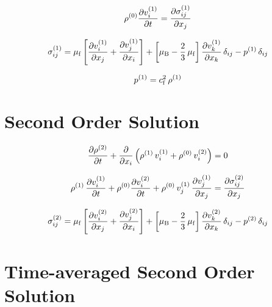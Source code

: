 \begin{equation}
  \rho^{(0)} \pdv{  v_{i}^{(1)}  }{t} = \pdv{  \sigma_{ij}^{(1)}  }{x_{j}}
  \label{eq:Th-st-navier}
\end{equation}

\begin{equation}
  \sigma_{ij}^{(1)} = \mu_{\mathrm{f}}\left[ \pdv{  v_{i}^{(1)}  }{x_{j}} + 
  \pdv{  v_{j}^{(1)}  }{x_{i}} \right] + \left[ \mu_{\mathrm{B}} - 
  \frac{2}{3}\,\mu_{\mathrm{f}} \right] \pdv{  v_{k}^{(1)}  }{x_{k}} \,\delta_{ij} - 
  p^{(1)}\,\delta_{ij}
  \label{eq:Th-st-stress}
\end{equation}

\begin{equation}
  p^{(1)} = c_{\mathrm{f}}^{2}\,\rho^{(1)}
  \label{eq:Th-st-pre}
\end{equation}



\section{Second Order Solution\label{sec:Th-secondorder}}

\begin{equation}
  \pdv{  \rho^{(2)}  }{t} + \pdv{x_{i}}\left(\rho^{(1)}\,v_{i}^{(1)} 
  + \rho^{(0)}\,v_{i}^{(2)} \right) = 0
  \label{eq:Th-nd-massconservatio}
\end{equation}

\begin{equation}
  \rho^{(1)}\,\pdv{  v_{i}^{(1)}  }{t} + \rho^{(0)} 
  \pdv{  v_{i}^{(2)}  }{t} + 
  \rho^{(0)}\,v_{j}^{(1)}\,\pdv{  v_{j}^{(1)}  }{x_{j}} = 
  \pdv{  \sigma_{ij}^{(2)}  }{x_{j}}
  \label{eq:Th-nd-navier}
\end{equation}

\begin{equation}
  \sigma_{ij}^{(2)} = \mu_{\mathrm{f}}\left[ \pdv{  v_{i}^{(2)}  }{x_{j}} + 
  \pdv{  v_{j}^{(2)}  }{x_{i}} \right] + \left[ \mu_{\mathrm{B}} - 
  \frac{2}{3}\,\mu_{\mathrm{f}} \right] \pdv{  v_{k}^{(2)}  }{x_{k}} \,\delta_{ij} - 
  p^{(2)}\,\delta_{ij}
  \label{eq:Th-nd-stress}
\end{equation}


\section{Time-averaged Second Order Solution\label{Th-avg-nd-order}}

